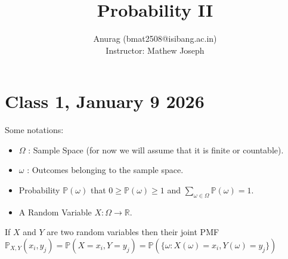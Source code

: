 \documentclass{article}
\title{Probability II}
\author{
\begin{tabular}{c}
Anurag (bmat2508@isibang.ac.in)\\[0.6em]
Instructor: Mathew Joseph
\end{tabular}
}
\date{}
\begin{document}
\maketitle
\section*{Class 1, January 9 2026}
Some notations:
\begin{itemize}
\item $\Omega$ : Sample Space (for now we will assume that it is finite or countable).
\item $\omega$ : Outcomes belonging to the sample space.
\item Probability $\mathbb{P}(\omega)$ that $0\geq \mathbb{P}(\omega) \geq 1$ and $\sum_{\omega \in \Omega} \mathbb{P}(\omega)=1$.
\item A Random Variable $X:\Omega \to \mathbb{R}$.
\end{itemize}
If $X$ and $Y$ are two random variables then their joint PMF\\
 $\mathbb{P}_{X,Y}(x_i,y_j)=\mathbb{P}(X=x_i,Y=y_j)=\mathbb{P}(\{\omega : X(\omega)=x_i,Y(\omega)=y_j\})$
\end{document}
